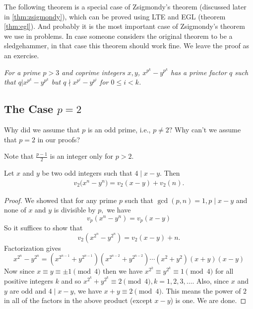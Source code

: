 \documentclass[main.tex]{subfile}
\begin{document}
    The following theorem is a  special case of Zsigmondy's theorem (discussed later in \eqref{thm:zsigmondy}), which can be proved using LTE and EGL (theorem \eqref{thm:egl}). And probably it is the most important case of Zsigmondy's theorem  we use in problems. In case someone considers the original theorem to be a sledgehammer, in that case this theorem should work fine. We leave the proof as an exercise.

    \begin{theorem}\slshape
    	For a prime $p>3$ and coprime integers $x,y$, $x^{p^k}-y^{p^k}$ has a prime factor $q$ such that $q|x^{p^k}-y^{p^k}$ but $q\nmid x^{p^i}-y^{p^i}$ for $0\le i<k$.
    \end{theorem}


\subsection{The Case \texorpdfstring{${p=2}$}{p = 2}}

    \begin{question}
        Why did we assume that $p$ is an odd prime, i.e., $p \neq 2 ?$ Why can't we assume that $p=2$ in our proofs?
    \end{question}

    \begin{hint}
        Note that $\frac{p-1}{2}$ is an integer only for $p>2.$
    \end{hint}


    \begin{theorem}[LTE for $p = 2$]
        Let $x$ and $y$ be two odd integers such that $4 \mid x-y.$ Then
         \begin{align*}
         v_2  \big(x^n - y^n \big) = v_2  (x-y ) + v_2  (n ).
         \end{align*}
    \end{theorem}

    \begin{proof}
        We showed that for any prime $p$ such that $\gcd(p,n)=1, p \mid x-y$ and  none of $x$ and $y$ is divisible by $p,$ we have
            \[v_p(  x^n - y^n ) = v_p(  x - y )\]
        So it suffices to show that
            \[v_2(  x^{2^{n}} - y^{2^{n}} ) = v_2(  x-y ) + n.\]
        Factorization gives
            \[x^{2^{n}} - y^{2^{n}} = (x^{2^{n-1}} + y^{2^{n-1}})(x^{2^{n-2}} + y^{2^{n-2}}) \cdots (x^2 + y^2 )(x + y)(x - y) \]
        Now since $x \equiv y \equiv \pm 1\pmod 4$ then we have $x^{2^{k}}  \equiv  y^{2^{k}} \equiv 1 \pmod 4$ for all positive integers $k$ and so $x^{2^{k}} + y^{2^{k}} \equiv 2 \pmod 4, k=1,2,3,\ldots.$ Also, since $x$ and $y$ are odd and $4\mid x-y$, we have $x+y \equiv 2\pmod 4$.
        This means the power of $2$ in all of the factors in the above product (except $x-y$) is one. We are done.
    \end{proof}
\end{document}
